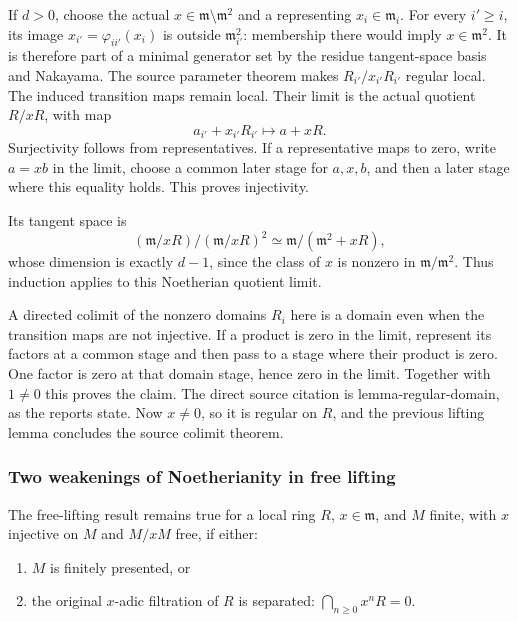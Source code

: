 If \(d>0\), choose the actual \(x\in\mathfrak m\setminus\mathfrak m^2\) and a representing \(x_i\in\mathfrak m_i\). For every \(i'\ge i\), its image \(x_{i'}=\varphi_{ii'}(x_i)\) is outside \(\mathfrak m_{i'}^2\): membership there would imply \(x\in\mathfrak m^2\). It is therefore part of a minimal generator set by the residue tangent-space basis and Nakayama. The source parameter theorem makes \(R_{i'}/x_{i'}R_{i'}\) regular local. The induced transition maps remain local. Their limit is the actual quotient \(R/xR\), with map \[
 a_{i'}+x_{i'}R_{i'}\longmapsto a+xR.
\] Surjectivity follows from representatives. If a representative maps to zero, write \(a=xb\) in the limit, choose a common later stage for \(a,x,b\), and then a later stage where this equality holds. This proves injectivity.

Its tangent space is \[
 (\mathfrak m/xR)/(\mathfrak m/xR)^2
 \simeq\mathfrak m/(\mathfrak m^2+xR),
\] whose dimension is exactly \(d-1\), since the class of \(x\) is nonzero in \(\mathfrak m/\mathfrak m^2\). Thus induction applies to this Noetherian quotient limit.

A directed colimit of the nonzero domains \(R_i\) here is a domain even when the transition maps are not injective. If a product is zero in the limit, represent its factors at a common stage and then pass to a stage where their product is zero. One factor is zero at that domain stage, hence zero in the limit. Together with \(1\ne0\) this proves the claim. The direct source citation is lemma-\AlgebraIdentifierBreak{}regular-\AlgebraIdentifierBreak{}domain, as the reports state. Now \(x\ne0\), so it is regular on \(R\), and the previous lifting lemma concludes the source colimit theorem.

\subsubsection{Two weakenings of Noetherianity in free lifting}\label{algebra-proof-020-two-weakenings-of-noetherianity-in-free-lifting}

The free-lifting result remains true for a local ring \(R\), \(x\in\mathfrak m\), and \(M\) finite, with \(x\) injective on \(M\) and \(M/xM\) free, if either:

\begin{enumerate}
\def\labelenumi{(\alph{enumi})}
\item
  \(M\) is finitely presented, or
\item
  the original \(x\)-adic filtration of \(R\) is separated: \(\bigcap_{n\ge0}x^nR=0\).
\end{enumerate}


